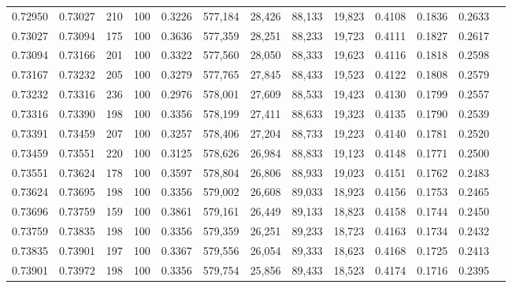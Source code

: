 \begin{tabular}{rrrrrrrrrrrrr}
0.72950 & 0.73027 &   210 & 100 &                                     0.3226 & 577,184 &  28,426 &  88,133 &  19,823 & 0.4108 & 0.1836 & 0.2633 \\
0.73027 & 0.73094 &   175 & 100 &                                     0.3636 & 577,359 &  28,251 &  88,233 &  19,723 & 0.4111 & 0.1827 & 0.2617 \\
0.73094 & 0.73166 &   201 & 100 &                                     0.3322 & 577,560 &  28,050 &  88,333 &  19,623 & 0.4116 & 0.1818 & 0.2598 \\
0.73167 & 0.73232 &   205 & 100 &                                     0.3279 & 577,765 &  27,845 &  88,433 &  19,523 & 0.4122 & 0.1808 & 0.2579 \\
0.73232 & 0.73316 &   236 & 100 &                                     0.2976 & 578,001 &  27,609 &  88,533 &  19,423 & 0.4130 & 0.1799 & 0.2557 \\
0.73316 & 0.73390 &   198 & 100 &                                     0.3356 & 578,199 &  27,411 &  88,633 &  19,323 & 0.4135 & 0.1790 & 0.2539 \\
0.73391 & 0.73459 &   207 & 100 &                                     0.3257 & 578,406 &  27,204 &  88,733 &  19,223 & 0.4140 & 0.1781 & 0.2520 \\
0.73459 & 0.73551 &   220 & 100 &                                     0.3125 & 578,626 &  26,984 &  88,833 &  19,123 & 0.4148 & 0.1771 & 0.2500 \\
0.73551 & 0.73624 &   178 & 100 &                                     0.3597 & 578,804 &  26,806 &  88,933 &  19,023 & 0.4151 & 0.1762 & 0.2483 \\
0.73624 & 0.73695 &   198 & 100 &                                     0.3356 & 579,002 &  26,608 &  89,033 &  18,923 & 0.4156 & 0.1753 & 0.2465 \\
0.73696 & 0.73759 &   159 & 100 &                                     0.3861 & 579,161 &  26,449 &  89,133 &  18,823 & 0.4158 & 0.1744 & 0.2450 \\
0.73759 & 0.73835 &   198 & 100 &                                     0.3356 & 579,359 &  26,251 &  89,233 &  18,723 & 0.4163 & 0.1734 & 0.2432 \\
0.73835 & 0.73901 &   197 & 100 &                                     0.3367 & 579,556 &  26,054 &  89,333 &  18,623 & 0.4168 & 0.1725 & 0.2413 \\
0.73901 & 0.73972 &   198 & 100 &                                     0.3356 & 579,754 &  25,856 &  89,433 &  18,523 & 0.4174 & 0.1716 & 0.2395 \\

\end{tabular}
